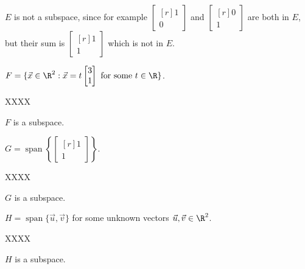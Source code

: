 \documentclass{problemset}
\DeclareMathOperator{\Span}{span}
\newcommand{\mat}[1]{\begin{bmatrix*}[r]#1\end{bmatrix*}}
\begin{document}
\begin{parts}
\begin{solution}
				$E$ is not a subspace, since for example  $\mat{1\\0}$ and $\mat{0\\1}$
				are both in $E$, but their sum is $\mat{1\\1}$ which is not in $E$.
			\end{solution}
		\item $F=\{\vec x\in\R^2:\vec x=t\mat{3\\1}\text{ for some }t\in\R\}$.
			\begin{solution}
				XXXX
					
				$F$ is a subspace. 
			\end{solution}
		\item $G=\Span\left\{\mat{1\\1}\right\}$.
			\begin{solution}
				XXXX
					
				$G$ is a subspace. 
			\end{solution}
		\item $H=\Span\{\vec u,\vec v\}$ for some unknown vectors $\vec u,\vec v\in\R^2$.
			\begin{solution}
				XXXX
					
				$H$ is a subspace. 
			\end{solution}
	\end{parts}
\end{document}
